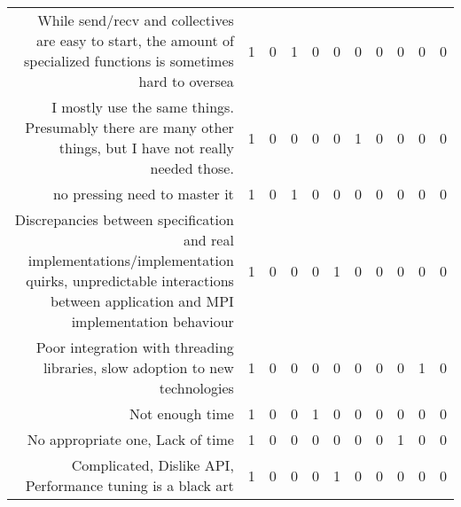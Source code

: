 {\begin{landscape}
\begin{longtable}[htb]{r|c|c|c|c|c|c|c|c|c|c}
{While send/recv and collectives are easy to start, the amount of specialized functions is sometimes hard to oversea} & 1 & 0 & 1 & 0 & 0 & 0 & 0 & 0 & 0 & 0 \\%
{I mostly use the same things.  Presumably there are many other things, but I have not really needed those.} & 1 & 0 & 0 & 0 & 0 & 1 & 0 & 0 & 0 & 0 \\%
{no pressing need to master it} & 1 & 0 & 1 & 0 & 0 & 0 & 0 & 0 & 0 & 0 \\%
{Discrepancies between specification and real implementations/implementation quirks, unpredictable interactions between application and MPI implementation behaviour} & 1 & 0 & 0 & 0 & 1 & 0 & 0 & 0 & 0 & 0 \\%
{Poor integration with threading libraries, slow adoption to new technologies} & 1 & 0 & 0 & 0 & 0 & 0 & 0 & 0 & 1 & 0 \\%
{Not enough time} & 1 & 0 & 0 & 1 & 0 & 0 & 0 & 0 & 0 & 0 \\%
{No appropriate one, Lack of time} & 1 & 0 & 0 & 0 & 0 & 0 & 0 & 1 & 0 & 0 \\%
{Complicated, Dislike API, Performance tuning is a black art} & 1 & 0 & 0 & 0 & 1 & 0 & 0 & 0 & 0 & 0 \\%
\hline%
\end{longtable}%
\end{landscape}}%
\clearpage%
